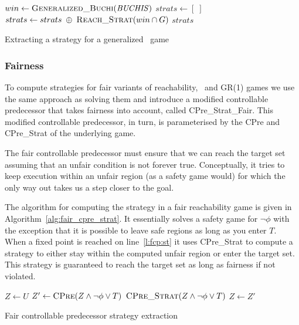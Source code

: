\begin{algorithm}
\begin{algorithmic}[1]

\State $win \gets \Call{Generalized\_Buchi}{\genbuchiobj}$ \label{l:gbs:wr}
    \State $strats \gets [\;]$
        \State $strats \gets strats \; \oplus \; \Call{Reach\_Strat}{win \cap G}$ \label{l:gbs:rs}
    \EndFor
    \State \Return $strats$
\EndFunction

\end{algorithmic}
\caption{Extracting a strategy for a generalized \buchi\ game}
\label{alg:gen_buchi_strat}
\end{algorithm}

\subsubsection{Fairness}

To compute strategies for fair variants of reachability, \buchi\ and GR(1) games we use the same approach as solving them and introduce a modified controllable predecessor that takes fairness into account, called CPre\_Strat\_Fair. This modified controllable predecessor, in turn, is parameterised by the CPre and CPre\_Strat of the underlying game.

The fair controllable predecessor must ensure that we can reach the target set assuming that an unfair condition is not forever true. Conceptually, it tries to keep execution within an unfair region (as a safety game would) for which the only way out takes us a step closer to the goal. 

The algorithm for computing the strategy in a fair reachability game is given in Algorithm~\ref{alg:fair_cpre_strat}. It essentially solves a safety game for $\neg\phi$ with the exception that it is possible to leave safe regions as long as you enter $T$. When a fixed point is reached on line~\ref{l:fcp:st} it uses CPre\_Strat to compute a strategy to either stay within the computed unfair region or enter the target set. This strategy is guaranteed to reach the target set as long as fairness if not violated.

\begin{algorithm}
\begin{algorithmic}[1]

    \State $Z \gets U$
    \Loop
        \State $Z' \gets \Call{CPre}{Z \wedge \neg\phi \vee T}$
        \State\Return $\Call{CPre\_Strat}{Z \wedge \neg\phi \vee T}$ \label{l:fcp:st}
        \EndIf
        \State $Z \gets Z'$
    \EndLoop
\EndFunction

\end{algorithmic}
\caption{Fair controllable predecessor strategy extraction}
\label{alg:fair_cpre_strat}
\end{algorithm}

